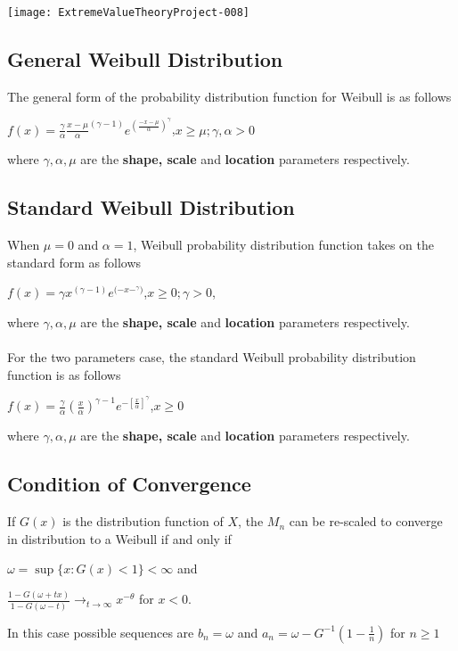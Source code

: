 \documentclass[11pt,a4paper]{article}
\theoremstyle{plain}
\begin{document}
\texttt{[image: ExtremeValueTheoryProject-008]}



\subsection*{General Weibull Distribution}
The general form of the probability distribution function for Weibull is as follows
\begin{center}
$f(x)=\frac{\gamma}{\alpha}\frac{x-\mu}{\alpha}^{(\gamma-1)}e^{(\frac{-x-\mu}{\alpha})^\gamma}$,\;\;\;\;\;$x \geq \mu ; \gamma, \alpha >0$
\end{center}
where $\gamma,\alpha, \mu$ are the \textbf{shape, scale} and \textbf{location} parameters respectively.

\subsection*{Standard Weibull Distribution}
When $\mu=0$ and $\alpha=1$, Weibull probability distribution function takes on the standard form as follows
\begin{center}
$f(x)=\gamma x^{(\gamma-1)}e^{({-x-^{\gamma})}}$,\;\;\;\;\;$x \geq 0;\gamma >0$, 
\end{center}
where $\gamma,\alpha, \mu$ are the \textbf{shape, scale} and \textbf{location} parameters respectively. \\
\\

For the two parameters case,  the standard Weibull probability distribution function is as follows
\begin{center}
$f(x)=\frac{\gamma}{\alpha}(\frac{x}{\alpha})^{\gamma-1}e^{-[\frac{x}{\alpha}]^\gamma}$,\;\;\;\;$x \geq 0$
\end{center}
where $\gamma,\alpha, \mu$ are the \textbf{shape, scale} and \textbf{location} parameters respectively.


\subsection*{Condition of Convergence}
If $G(x)$ is the distribution function of $X$, the $M_n$ can be re-scaled to converge in distribution to a Weibull if and only if
\begin{center}
$\omega=\sup \{x:G(x)<1\}<\infty$ and 
\end{center}
\begin{center}
$\frac{1-G(\omega+tx)}{1-G(\omega - t) }\rightarrow_{t \rightarrow \infty} x^{-\theta}$ for $x<0$.
\end{center}
In this case possible sequences are $b_n=\omega$ and $a_n=\omega-G^{-1}(1-\frac{1}{n})$ for $n \geq 1$
\end{document}

